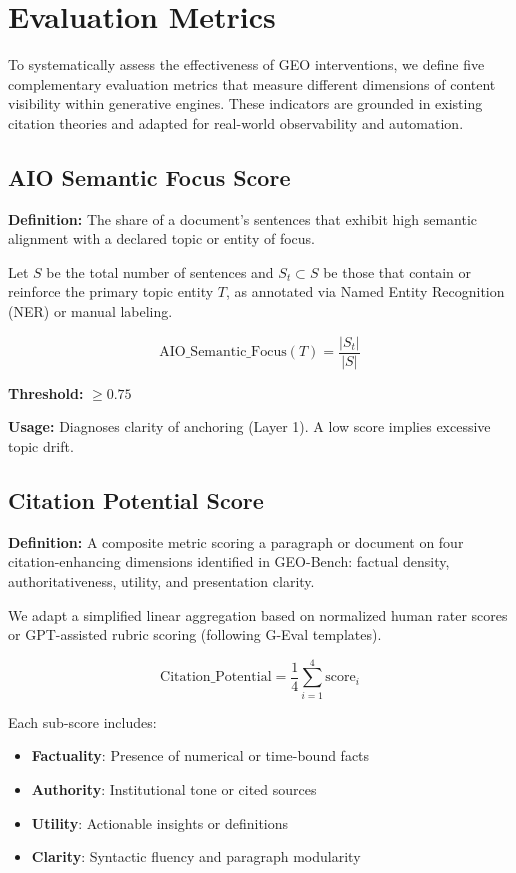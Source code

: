 \section{Evaluation Metrics}

To systematically assess the effectiveness of GEO interventions, we define five complementary evaluation metrics that measure different dimensions of content visibility within generative engines. These indicators are grounded in existing citation theories \cite{aggarwal2024geo, liu2023verifiability, menick2022quotes} and adapted for real-world observability and automation.

\subsection{AIO Semantic Focus Score}

\textbf{Definition:} The share of a document’s sentences that exhibit high semantic alignment with a declared topic or entity of focus.

Let $S$ be the total number of sentences and $S_t \subset S$ be those that contain or reinforce the primary topic entity $T$, as annotated via Named Entity Recognition (NER) or manual labeling.

\[
\text{AIO\_Semantic\_Focus}(T) = \frac{|S_t|}{|S|}
\]

\textbf{Threshold:} $\geq 0.75$

\textbf{Usage:} Diagnoses clarity of anchoring (Layer 1). A low score implies excessive topic drift.

\subsection{Citation Potential Score}

\textbf{Definition:} A composite metric scoring a paragraph or document on four citation-enhancing dimensions identified in GEO-Bench: factual density, authoritativeness, utility, and presentation clarity.

We adapt a simplified linear aggregation based on normalized human rater scores or GPT-assisted rubric scoring (following G-Eval templates).

\[
\text{Citation\_Potential} = \frac{1}{4} \sum_{i=1}^{4} \text{score}_i
\]

Each sub-score includes:
\begin{itemize}
  \item \textbf{Factuality}: Presence of numerical or time-bound facts
  \item \textbf{Authority}: Institutional tone or cited sources
  \item \textbf{Utility}: Actionable insights or definitions
  \item \textbf{Clarity}: Syntactic fluency and paragraph modularity
\end{itemize}

